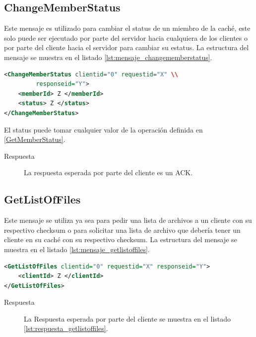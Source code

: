 \subsection{ChangeMemberStatus}
Este mensaje es utilizado para cambiar el status de un miembro de la caché, este solo puede ser ejecutado por parte del servidor hacia cualquiera de los clientes o  por parte del cliente hacia el servidor para cambiar su estatus. La estructura del mensaje se muestra en el listado \ref{lst:mensaje_changememberstatus}.

\begin{lstlisting}[language=XML,caption={Mensaje de ChangeMemberStatus},label={lst:mensaje_changememberstatus}]
<ChangeMemberStatus clientid="0" requestid="X" \\
		 responseid="Y"> 
	<memberId> Z </memberId>
	<status> Z </status>
</ChangeMemberStatus>
\end{lstlisting}


El status puede tomar cualquier valor de la operación definida en \ref{GetMemberStatus}. 


\begin{description}
\item[Respuesta] La respuesta esperada por parte del cliente es un ACK.
\end{description}

\subsection{GetListOfFiles}

Este mensaje se utiliza ya sea para pedir una lista de archivos a un cliente con su respectivo checksum o para solicitar una lista de archivo que debería tener un cliente en su caché con su respectivo checksum. La estructura del mensaje se muestra en el listado \ref{lst:mensaje_getlistoffiles}.

\begin{lstlisting}[language=XML,caption={Mensaje de GetListOfFiles},label={lst:mensaje_getlistoffiles}]
<GetListOfFiles clientid="0" requestid="X" responseid="Y"> 
	<clientId> Z </clientId>
</GetListOfFiles>
\end{lstlisting}

\begin{description}
\item[Respuesta] La Respuesta esperada por parte del cliente se muestra en el listado \ref{lst:respuesta_getlistoffiles}.
\end{description}

